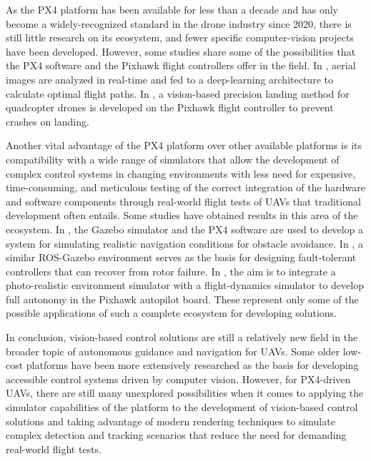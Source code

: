 As the PX4 platform has been available for less than a decade and has only become a widely-recognized standard in the drone industry since 2020, there is still little research on its ecosystem, and fewer specific computer-vision projects have been developed.
However, some studies share some of the possibilities that the PX4 software and the Pixhawk flight controllers offer in the field.
In \cite{sizkouhi2022}, aerial images are analyzed in real-time and fed to a deep-learning architecture to calculate optimal flight paths.
In \cite{naufal2022}, a vision-based precision landing method for quadcopter drones is developed on the Pixhawk flight controller to prevent crashes on landing.

Another vital advantage of the PX4 platform over other available platforms is its compatibility with a wide range of simulators that allow the development of complex control systems in changing environments with less need for expensive, time-consuming, and meticulous testing of the correct integration of the hardware and software components through real-world flight tests of UAVs that traditional development often entails.
Some studies have obtained results in this area of the ecosystem.
In \cite{garcia2022}, the Gazebo simulator and the PX4 software are used to develop a system for simulating realistic navigation conditions for obstacle avoidance.
In \cite{chen2022}, a similar ROS-Gazebo environment serves as the basis for designing fault-tolerant controllers that can recover from rotor failure.
In \cite{huynh2022}, the aim is to integrate a photo-realistic environment simulator with a flight-dynamics simulator to develop full autonomy in the Pixhawk autopilot board.
These represent only some of the possible applications of such a complete ecosystem for developing solutions.

In conclusion, vision-based control solutions are still a relatively new field in the broader topic of autonomous guidance and navigation for UAVs.
Some older low-cost platforms have been more extensively researched as the basis for developing accessible control systems driven by computer vision.
However, for PX4-driven UAVs, there are still many unexplored possibilities when it comes to applying the simulator capabilities of the platform to the development of vision-based control solutions and taking advantage of modern rendering techniques to simulate complex detection and tracking scenarios that reduce the need for demanding real-world flight tests.